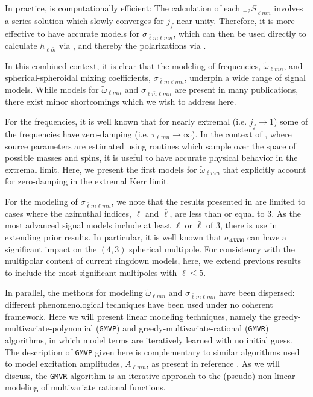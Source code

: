 \documentclass[twocolumn,aps,prd,floatfix,preprintnumbers,a4paper,nofootinbib,
superscriptaddress,10pt]{revtex4-1}
\newcommand{\cw}{\tilde{\omega}}
\def\jf{j_f}
\def\lmn{_{\ell m n}}
\def\LM{_{\bar{\ell} \bar{m}}}
\def\LMlmn{_{\bar{\ell} \bar{m} \ell m n}}
\def\gmvp#1{greedy-multivariate-polynomial#1
  (\texttt{GMVP}#1)\gdef\gmvp{\texttt{GMVP}}}
\def\gmvr#1{greedy-multivariate-rational#1
  (\texttt{GMVR}#1)\gdef\gmvr{\texttt{GMVR}}}
\begin{document}
%
\par In practice,  is computationally efficient:
%
The calculation of each ${_{-2}S}\lmn$ involves a series solution which slowly converges for $\jf$ near unity. Therefore, it is more effective to have accurate models for $\sigma\LMlmn$, which can then be used directly to calculate $h\LM$ via , and thereby the \gw{} polarizations via .
%
%
\par In this combined context, it is clear that the modeling of \qnm{} frequencies, $\cw\lmn$, and spherical-spheroidal mixing coefficients, $\sigma\LMlmn$, underpin a wide range of \gw{} signal models.
%
While models for $\cw\lmn$ and $\sigma\LMlmn$ are present in many publications, there exist minor shortcomings which we wish to address here.
%
\par For the \qnm{} frequencies, it is well known that for nearly extremal  (i.e. $\jf \rightarrow 1$) some of the frequencies have zero-damping (i.e. $\tau\lmn \rightarrow \infty$).
%
In the context of \aligo{} \da{}, where source parameters are estimated using routines which sample over the space of possible \bh{} masses and spins, it is useful to have accurate physical behavior in the extremal limit.
%
Here, we present the first models for $\cw\lmn$ that explicitly account for zero-damping in the extremal Kerr limit.
%
\par For the modeling of $\sigma\LMlmn$, we note that the results presented in \red{[X]} are limited to cases where the azimuthal indices, $\ell$ and $\bar{\ell}$, are less than or equal to 3.
%
As the most advanced signal models include at least $\ell$ or $\bar{\ell}$ of 3, there is use in extending prior results.
%
In particular, it is well known that $\sigma_{43330}$ can have a significant impact on the $(4,3)$ spherical multipole.
%
For consistency with the multipolar content of current ringdown models, here, we extend previous results to include the most significant multipoles with $\ell \leq 5$.
%
%
\par In parallel, the methods for modeling $\cw\lmn$ and $\sigma\LMlmn$ have been dispersed: different phenomenological techniques have been used under no coherent framework.
%
Here we will present linear modeling techniques, namely the \gmvp{} and \gmvr{} algorithms, in which model terms are iteratively learned with no initial guess.
%
The description of \gmvp{} given here is complementary to similar algorithms used to model \qnm{} excitation amplitudes, $A\lmn$, as present in reference \red{[cite]}.
%
As we will discuss, the \gmvr{} algorithm is an iterative approach to the (pseudo) non-linear modeling of multivariate rational functions.
\end{document}
